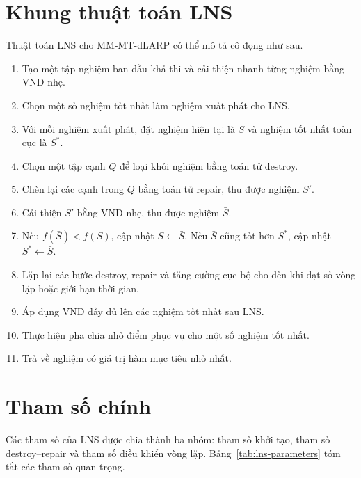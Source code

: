 \section{Khung thuật toán LNS}
\label{sec:lns-algorithm}

Thuật toán LNS cho MM-MT-dLARP có thể mô tả cô đọng như sau.

\begin{enumerate}[label=\textbf{Bước \arabic*.}, leftmargin=1.6cm]
\item Tạo một tập nghiệm ban đầu khả thi và cải thiện nhanh từng nghiệm bằng VND nhẹ.
\item Chọn một số nghiệm tốt nhất làm nghiệm xuất phát cho LNS.
\item Với mỗi nghiệm xuất phát, đặt nghiệm hiện tại là $S$ và nghiệm tốt nhất toàn cục là $S^*$.
\item Chọn một tập cạnh $Q$ để loại khỏi nghiệm bằng toán tử destroy.
\item Chèn lại các cạnh trong $Q$ bằng toán tử repair, thu được nghiệm $S'$.
\item Cải thiện $S'$ bằng VND nhẹ, thu được nghiệm $\bar{S}$.
\item Nếu $f(\bar{S}) < f(S)$, cập nhật $S \leftarrow \bar{S}$. Nếu $\bar{S}$ cũng tốt hơn $S^*$, cập nhật $S^* \leftarrow \bar{S}$.
\item Lặp lại các bước destroy, repair và tăng cường cục bộ cho đến khi đạt số vòng lặp hoặc giới hạn thời gian.
\item Áp dụng VND đầy đủ lên các nghiệm tốt nhất sau LNS.
\item Thực hiện pha chia nhỏ điểm phục vụ cho một số nghiệm tốt nhất.
\item Trả về nghiệm có giá trị hàm mục tiêu nhỏ nhất.
\end{enumerate}

\section{Tham số chính}
\label{sec:lns-parameters}

Các tham số của LNS được chia thành ba nhóm: tham số khởi tạo, tham số destroy--repair và tham số điều khiển vòng lặp. Bảng~\ref{tab:lns-parameters} tóm tắt các tham số quan trọng.

